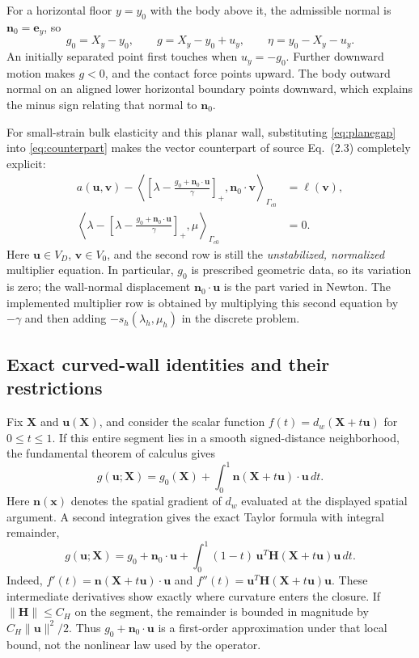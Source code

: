 \documentclass[preprint,11pt]{elsarticle}
\numberwithin{equation}{section}
\newcommand{\bu}{\boldsymbol{u}}
\newcommand{\bv}{\boldsymbol{v}}
\newcommand{\bx}{\boldsymbol{x}}
\newcommand{\bX}{\boldsymbol{X}}
\newcommand{\bn}{\boldsymbol{n}}
\newcommand{\bH}{\boldsymbol{H}}
\newcommand{\Gc}{\Gamma_{c0}}
\newcommand{\pos}[1]{\left[#1\right]_+}
\begin{document}
For a horizontal floor $y=y_0$ with the body above it, the admissible
normal is $\bn_0=\boldsymbol{e}_y$, so
\begin{equation}
 g_0=X_y-y_0,\qquad g=X_y-y_0+u_y,\qquad
 \eta=y_0-X_y-u_y.
 \label{eq:floor}
\end{equation}
An initially separated point first touches when $u_y=-g_0$. Further
downward motion makes $g<0$, and the contact force points upward.
The body outward normal on an aligned lower horizontal boundary points
downward, which explains the minus sign relating that normal to $\bn_0$.

For small-strain bulk elasticity and this planar wall, substituting
\eqref{eq:planegap} into \eqref{eq:counterpart} makes the vector counterpart
of source Eq.~(2.3) completely explicit:
\begin{equation}
 \boxed{\begin{aligned}
 a(\bu,\bv)
 -\left\langle
    \pos{\lambda-\frac{g_0+\bn_0\cdot\bu}{\gamma}},
    \bn_0\cdot\bv
  \right\rangle_{\Gc}&=\ell(\bv),\\
 \left\langle
    \lambda-\pos{\lambda-\frac{g_0+\bn_0\cdot\bu}{\gamma}},
    \mu
  \right\rangle_{\Gc}&=0.
 \end{aligned}}
 \label{eq:expandedplane}
\end{equation}
Here $\bu\in V_D$, $\bv\in V_0$, and the second row is still the
\emph{unstabilized, normalized} multiplier equation. In particular,
$g_0$ is prescribed geometric data, so its variation is zero; the wall-normal
displacement $\bn_0\cdot\bu$ is the part varied in Newton. The implemented
multiplier row is obtained by multiplying this second equation by
$-\gamma$ and then adding $-s_h(\lambda_h,\mu_h)$ in the discrete problem.

\subsection{Exact curved-wall identities and their restrictions}
Fix $\bX$ and $\bu(\bX)$, and consider the scalar function
$f(t)=d_w(\bX+t\bu)$ for $0\leq t\leq1$.
If this entire segment lies in a smooth signed-distance neighborhood, the
fundamental theorem of calculus gives
\begin{equation}
 g(\bu;\bX)=g_0(\bX)
   +\int_0^1\bn(\bX+t\bu)\cdot\bu\,dt.
 \label{eq:gapintegral}
\end{equation}
Here $\bn(\bx)$ denotes the spatial gradient of $d_w$ evaluated at the
displayed spatial argument. A second integration gives the exact Taylor
formula with integral remainder,
\begin{equation}
 \boxed{g(\bu;\bX)=g_0+\bn_0\cdot\bu
 +\int_0^1(1-t)\,\bu^T\bH(\bX+t\bu)\bu\,dt.}
 \label{eq:gapremainder}
\end{equation}
Indeed, $f'(t)=\bn(\bX+t\bu)\cdot\bu$ and
$f''(t)=\bu^T\bH(\bX+t\bu)\bu$. These intermediate derivatives
show exactly where curvature enters the closure. If
$\|\bH\|\leq C_H$ on the segment, the remainder is bounded in magnitude
by $C_H\|\bu\|^2/2$. Thus $g_0+\bn_0\cdot\bu$ is a first-order
approximation under that local bound, not the nonlinear law used by the
operator.
\end{document}
